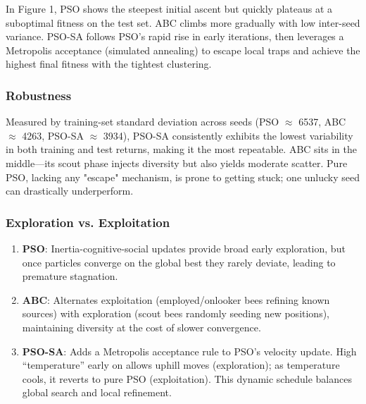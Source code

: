 \documentclass[a4paper, 12pt]{extarticle}
\begin{document}
In Figure 1, PSO shows the steepest initial ascent but quickly plateaus at a suboptimal fitness on the test set. ABC climbs more gradually with low inter-seed variance. PSO-SA follows PSO's rapid rise in early iterations, then leverages a Metropolis acceptance (simulated annealing) to escape local traps and achieve the highest final fitness with the tightest clustering. 

\subsubsection{Robustness}
Measured by training-set standard deviation across seeds (PSO $\approx$ 6537, ABC $\approx$ 4263, PSO-SA $\approx$ 3934),  PSO-SA consistently exhibits the lowest variability in both training and test returns, making it the most repeatable. ABC sits in the middle—its scout phase injects diversity but also yields moderate scatter. Pure PSO, lacking any "escape" mechanism, is prone to getting stuck; one unlucky seed can drastically underperform. 

\subsubsection{Exploration vs. Exploitation}
\begin{enumerate}
    \item    \textbf{PSO}: Inertia-cognitive-social updates provide broad early exploration, but once particles converge on the global best they rarely deviate, leading to premature stagnation. 
    \item     \textbf{ABC}: Alternates exploitation (employed/onlooker bees refining known sources) with exploration (scout bees randomly seeding new positions), maintaining diversity at the cost of slower convergence. 
    \item     \textbf{PSO-SA}: Adds a Metropolis acceptance rule to PSO's velocity update. High “temperature” early on allows uphill moves (exploration); as temperature cools, it reverts to pure PSO (exploitation). This dynamic schedule balances global search and local refinement. 
\end{enumerate}
\end{document}
